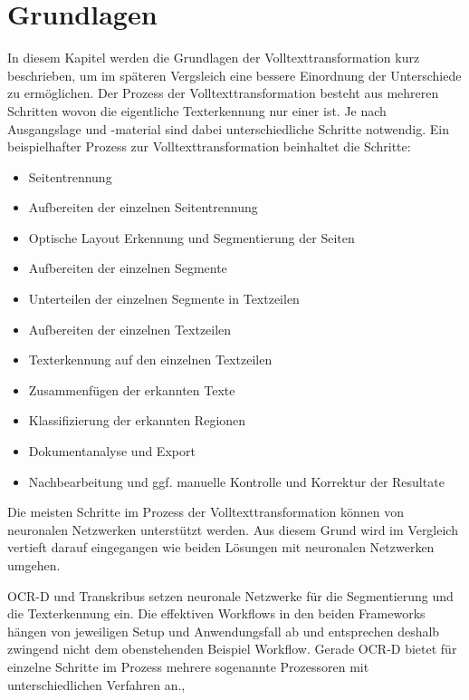 \documentclass[a4paper,oneside, 12pt]{report}
\begin{document}
\chapter{Grundlagen}\label{sec:grundlagen}
In diesem Kapitel werden die Grundlagen der Volltexttransformation kurz beschrieben, um im späteren Vergsleich eine bessere Einordnung der Unterschiede zu ermöglichen. Der Prozess der Volltexttransformation besteht aus mehreren Schritten wovon die eigentliche Texterkennung nur einer ist. Je nach Ausgangslage und -material sind dabei unterschiedliche Schritte notwendig. Ein beispielhafter Prozess zur Volltexttransformation beinhaltet die Schritte:
\begin{itemize}\itemsep=0.5pt
  \item Seitentrennung
  \item Aufbereiten der einzelnen Seitentrennung
  \item Optische Layout Erkennung und Segmentierung der Seiten
  \item Aufbereiten der einzelnen Segmente
  \item Unterteilen der einzelnen Segmente in Textzeilen
  \item Aufbereiten der einzelnen Textzeilen
  \item Texterkennung auf den einzelnen Textzeilen
  \item Zusammenfügen der erkannten Texte
  \item Klassifizierung der erkannten Regionen
  \item Dokumentanalyse und Export
  \item Nachbearbeitung und ggf. manuelle Kontrolle und Korrektur der Resultate
\end{itemize}

Die meisten Schritte im Prozess der Volltexttransformation können von neuronalen Netzwerken unterstützt werden. Aus diesem Grund wird im Vergleich vertieft darauf eingegangen wie beiden Lösungen mit neuronalen Netzwerken umgehen. 

OCR-D und Transkribus setzen neuronale Netzwerke für die Segmentierung und die Texterkennung ein. Die effektiven Workflows in den beiden Frameworks hängen von jeweiligen Setup und Anwendungsfall ab und entsprechen deshalb zwingend nicht dem obenstehenden Beispiel Workflow. Gerade OCR-D bietet für einzelne Schritte im Prozess mehrere sogenannte Prozessoren mit unterschiedlichen Verfahren an.\cite{transkribus}, \cite{ocrdworkflows} 
 
\end{document}
